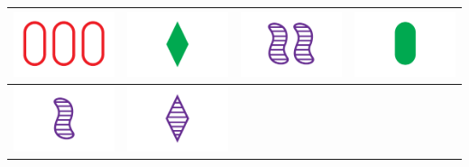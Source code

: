 \documentclass[a4paper,12pt,titlepage]{article}
\theoremstyle{plain}
\theoremstyle{definition}
\begin{document}
\begin{table}[h]
\begin{tabular}{ c | c | c | c }
    \hline
    \includegraphics[scale=0.2]{2200.png} &
    \includegraphics[scale=0.2]{0012.png} &
    \includegraphics[scale=0.2]{1121.png} &
    \includegraphics[scale=0.2]{0010.png} \\
    \hline
    \includegraphics[scale=0.2]{0121.png} &
    \includegraphics[scale=0.2]{0122.png} &

\end{tabular}
\end{table}
\end{document}
